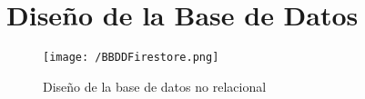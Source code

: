 \chapter{Diseño de la Base de Datos}

\begin{figure}[!h]
	\begin{center}
		\texttt{[image: /BBDDFirestore.png]}
		\caption{Diseño de la base de datos no relacional}
		\label{fig:bbddfirestore}
	\end{center}
\end{figure}
